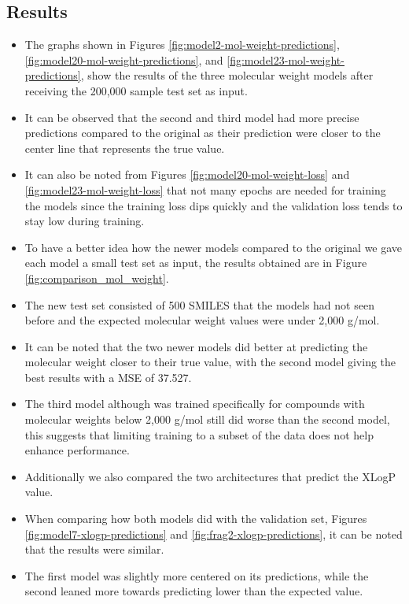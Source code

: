     \subsection{Results}
    \begin{itemize}
        \item The graphs shown in Figures \ref{fig:model2-mol-weight-predictions}, \ref{fig:model20-mol-weight-predictions}, and \ref{fig:model23-mol-weight-predictions}, show the results of the three molecular weight models after receiving the 200,000 sample test set as input.
        \item It can be observed that the second and third model had more precise predictions compared to the original as their prediction were closer to the center line that represents the true value.
        \item It can also be noted from Figures \ref{fig:model20-mol-weight-loss} and \ref{fig:model23-mol-weight-loss} that not many epochs are needed for training the models since the training loss dips quickly and the validation loss tends to stay low during training.
        \item To have a better idea how the newer models compared to the original we gave each model a small test set as input, the results obtained are in Figure \ref{fig:comparison_mol_weight}.
        \item The new test set consisted of 500 SMILES that the models had not seen before and the expected molecular weight values were under 2,000 g/mol.
        \item It can be noted that the two newer models did better at predicting the molecular weight closer to their true value, with the second model giving the best results with a MSE of 37.527.
        \item The third model although was trained specifically for compounds with molecular weights below 2,000 g/mol still did worse than the second model, this suggests that limiting training to a subset of the data does not help enhance performance.
        \item Additionally we also compared the two architectures that predict the XLogP value.
        \item When comparing how both models did with the validation set, Figures \ref{fig:model7-xlogp-predictions} and \ref{fig:frag2-xlogp-predictions}, it can be noted that the results were similar. 
        \item The first model was slightly more centered on its predictions, while the second leaned more towards predicting lower than the expected value. 

\end{itemize}
